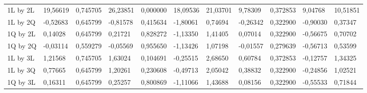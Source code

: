 \begin{table}[H]
{\begin{tabular}{lllllllllll}
\rowcolor[HTML]{FFFFFF} 
1L by 2L       & {\color[HTML]{FF0000} 19,56619} & {\color[HTML]{FF0000} 0,745705} & {\color[HTML]{FF0000} 26,23851} & {\color[HTML]{FF0000} 0,000000} & {\color[HTML]{FF0000} 18,09536} & {\color[HTML]{FF0000} 21,03701} & {\color[HTML]{FF0000} 9,78309}  & {\color[HTML]{FF0000} 0,372853} & {\color[HTML]{FF0000} 9,04768}  & {\color[HTML]{FF0000} 10,51851} \\
\rowcolor[HTML]{FFFFFF} 
1L by 2Q       & {\color[HTML]{181A1B} -0,52683} & {\color[HTML]{181A1B} 0,645799} & {\color[HTML]{181A1B} -0,81578} & {\color[HTML]{181A1B} 0,415634} & {\color[HTML]{181A1B} -1,80061} & {\color[HTML]{181A1B} 0,74694}  & {\color[HTML]{181A1B} -0,26342} & {\color[HTML]{181A1B} 0,322900} & {\color[HTML]{181A1B} -0,90030} & {\color[HTML]{181A1B} 0,37347}  \\
\rowcolor[HTML]{FFFFFF} 
1Q by 2L       & {\color[HTML]{181A1B} 0,14028}  & {\color[HTML]{181A1B} 0,645799} & {\color[HTML]{181A1B} 0,21721}  & {\color[HTML]{181A1B} 0,828272} & {\color[HTML]{181A1B} -1,13350} & {\color[HTML]{181A1B} 1,41405}  & {\color[HTML]{181A1B} 0,07014}  & {\color[HTML]{181A1B} 0,322900} & {\color[HTML]{181A1B} -0,56675} & {\color[HTML]{181A1B} 0,70702}  \\
\rowcolor[HTML]{FFFFFF} 
1Q by 2Q       & {\color[HTML]{181A1B} -0,03114} & {\color[HTML]{181A1B} 0,559279} & {\color[HTML]{181A1B} -0,05569} & {\color[HTML]{181A1B} 0,955650} & {\color[HTML]{181A1B} -1,13426} & {\color[HTML]{181A1B} 1,07198}  & {\color[HTML]{181A1B} -0,01557} & {\color[HTML]{181A1B} 0,279639} & {\color[HTML]{181A1B} -0,56713} & {\color[HTML]{181A1B} 0,53599}  \\
\rowcolor[HTML]{FFFFFF} 
1L by 3L       & {\color[HTML]{181A1B} 1,21568}  & {\color[HTML]{181A1B} 0,745705} & {\color[HTML]{181A1B} 1,63024}  & {\color[HTML]{181A1B} 0,104691} & {\color[HTML]{181A1B} -0,25515} & {\color[HTML]{181A1B} 2,68650}  & {\color[HTML]{181A1B} 0,60784}  & {\color[HTML]{181A1B} 0,372853} & {\color[HTML]{181A1B} -0,12757} & {\color[HTML]{181A1B} 1,34325}  \\
\rowcolor[HTML]{FFFFFF} 
1L by 3Q       & {\color[HTML]{181A1B} 0,77665}  & {\color[HTML]{181A1B} 0,645799} & {\color[HTML]{181A1B} 1,20261}  & {\color[HTML]{181A1B} 0,230608} & {\color[HTML]{181A1B} -0,49713} & {\color[HTML]{181A1B} 2,05042}  & {\color[HTML]{181A1B} 0,38832}  & {\color[HTML]{181A1B} 0,322900} & {\color[HTML]{181A1B} -0,24856} & {\color[HTML]{181A1B} 1,02521}  \\
\rowcolor[HTML]{FFFFFF} 
1Q by 3L       & {\color[HTML]{181A1B} 0,16311}  & {\color[HTML]{181A1B} 0,645799} & {\color[HTML]{181A1B} 0,25257}  & {\color[HTML]{181A1B} 0,800869} & {\color[HTML]{181A1B} -1,11066} & {\color[HTML]{181A1B} 1,43688}  & {\color[HTML]{181A1B} 0,08156}  & {\color[HTML]{181A1B} 0,322900} & {\color[HTML]{181A1B} -0,55533} & {\color[HTML]{181A1B} 0,71844}  \\

\end{tabular}}
\end{table}
